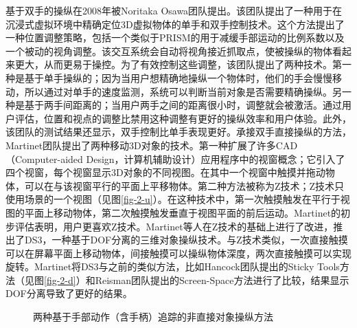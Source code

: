 基于双手的操纵在2008年被Noritaka Osawa团队提出。该团队提出了一种用于在沉浸式虚拟环境中精确定位3D虚拟物体的单手和双手控制技术。这个方法提出了一种位置调整策略，包括一个类似于PRISM的用于减缓手部运动的比例系数以及一个被动的视角调整。该交互系统会自动将视角接近抓取点，使被操纵的物体看起来更大，从而更易于操控。为了有效控制这些调整，该团队提出了两种技术。第一种是基于单手操纵的；因为当用户想精确地操纵一个物体时，他们的手会慢慢移动，所以通过对单手的速度监测，系统可以判断当前对象是否需要精确操纵。另一种是基于两手间距离的；当用户两手之间的距离很小时，调整就会被激活。通过用户评估，位置和视点的调整比禁用这种调整有更好的操纵效率和用户体验。此外，该团队的测试结果还显示，双手控制比单手表现更好。承接双手直接操纵的方法，Martinet团队提出了两种移动3D对象的技术。第一种扩展了许多CAD（Computer-aided Design，计算机辅助设计）应用程序中的视窗概念；它引入了四个视窗，每个视窗显示3D对象的不同视图。在其中一个视窗中触摸并拖动物体，可以在与该视窗平行的平面上平移物体。第二种方法被称为Z技术；Z技术只使用场景的一个视图（见图\ref{fig-2-u}）。在这种技术中，第一次触摸触发在平行于视图的平面上移动物体，第二次触摸触发垂直于视图平面的前后运动。Martinet的初步评估表明，用户更喜欢Z技术。Martinet等人在Z技术的基础上进行了改进，推出了DS3，一种基于DOF分离的三维对象操纵技术。与Z技术类似，一次直接触摸可以在屏幕平面上移动物体，间接触摸可以操纵物体深度，两次直接触摸可以实现旋转。Martinet将DS3与之前的类似方法，比如Hancock团队提出的Sticky Tools方法（见图\ref{fig-2-d}）和Reisman团队提出的Screen-Space方法进行了比较，结果显示DOF分离导致了更好的结果。

\begin{figure}[t!]
    \centering
    \hspace{0.2em} %
    \caption{两种基于手部动作（含手柄）追踪的非直接对象操纵方法}
    \label{fig-4}
\end{figure}

